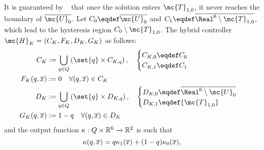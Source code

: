 It is guaranteed by ~\cite[Proposition III.3]{AkhNieWas2015} that once the solution enters $\mc{T}_{1,0}$, it never reaches the boundary of $\overline{\mc{U}_0}$.
Let $C_{0} \eqdef \overline{\mc{U}_0}$ and $C_{1} \eqdef \overline{\Real^6\setminus\mc{T}_{1,0}}$, which lead to the hysteresis region $C_{0}\setminus \mc{T}_{1,0}$. The hybrid controller $\mc{H}_K = (C_{K}, F_{K}, D_{K}, G_{K})$ 
as follows:
\begin{subequations}\label{eq:Hyb-control}
\begin{align}
\label{eq:Hyb-control-1}
C_{K} &:= \bigcup_{q\in Q}\left( \set{q}\times  C_{K,q}  \right),\quad
\begin{cases}
C_{K,0} \eqdef C_0\\ 
C_{K,1} \eqdef C_1\\
\end{cases}\\
\label{eq:Hyb-control-4}
    F_{K}(q, \agx) &:= 0\quad \forall (q,\agx) \in C_{K}\\
%
\label{eq:Hyb-control-2}
D_{K} &:= \bigcup_{q\in Q}\left( \set{q} \times D_{K,q}
\right),\quad
\begin{cases}
D_{K,0} \eqdef \overline{\Real^6\setminus\mc{U}_{0}}\\ 
D_{K,1} \eqdef {\mc{T}_{1,0}}\\
\end{cases}\\
\label{eq:Hyb-control-5}
    G_{K}(q,\agx) &:= 1 -q \quad \forall (q,\agx) \in D_{K}
\end{align}
\end{subequations}
and the output function $\kappa: Q\times \mathbb{R}^{6} \to \mathbb{R}^{2}$ is such that
\begin{equation}
\label{eq:Hyb-control-3}
\kappa(q,\overline{x}) = q\kappa_{1}(\overline{x}) + (1-q)\kappa_{0}(\overline{x}),
\end{equation}
